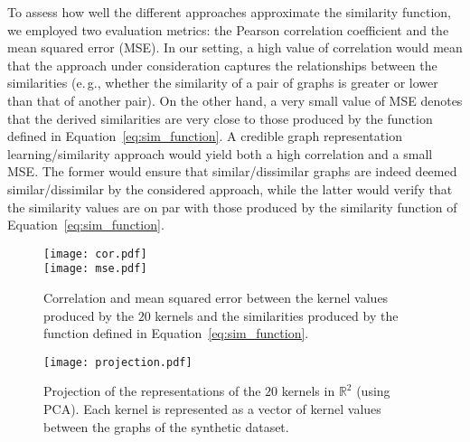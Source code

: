 \documentclass[twoside,11pt]{article}
\newcommand{\eg}{e.\,g., }
\begin{document}
To assess how well the different approaches approximate the similarity function, we employed two evaluation metrics: the Pearson correlation coefficient and the mean squared error (MSE).
In our setting, a high value of correlation would mean that the approach under consideration captures the relationships between the similarities (\eg whether the similarity of a pair of graphs is greater or lower than that of another pair).
On the other hand, a very small value of MSE denotes that the derived similarities are very close to those produced by the function defined in Equation~\eqref{eq:sim_function}.
A credible graph representation learning/similarity approach would yield both a high correlation and a small MSE.
The former would ensure that similar/dissimilar graphs are indeed deemed similar/dissimilar by the considered approach, while the latter would verify that the similarity values are on par with those produced by the similarity function of Equation~\eqref{eq:sim_function}.

\begin{figure}[t]
    \centering
    \subfloat
    {\texttt{[image: cor.pdf]}}\\
    \subfloat
    {\texttt{[image: mse.pdf]}}
    \caption{Correlation and mean squared error between the kernel values produced by the $20$ kernels and the similarities produced by the function defined in Equation~\eqref{eq:sim_function}.}
    \label{fig:cor_mse}
\end{figure}

\begin{figure}[t]
    \centering
    \texttt{[image: projection.pdf]}
    \caption{Projection of the representations of the $20$ kernels in $\mathbb{R}^2$ (using PCA). Each kernel is represented as a vector of kernel values between the graphs of the synthetic dataset.}
    \label{fig:pca_projection}
\end{figure}
\end{document}
